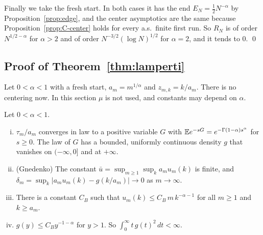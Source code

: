 Finally we take the fresh start. In both cases it has the end $E_N=\frac12N^{-\alpha}$
by Proposition~\ref{prop:edge}, and the center asymptotics are the same because
Proposition~\ref{prop:C-center} holds for every a.s.\ finite first run. So $R_N$ is of
order $N^{1/2-\alpha}$ for $\alpha>2$ and of order $N^{-3/2}(\log N)^{1/2}$ for
$\alpha=2$, and it tends to $0$.
\qed

\subsection{Proof of Theorem~\ref{thm:lamperti}}\label{app:heavy-lamperti}

Let $0<\alpha<1$ with a fresh start, $a_m=m^{1/\alpha}$ and $z_{m,k}=k/a_m$. There is no
centering now. In this section $\mu$ is not used, and constants may depend on $\alpha$.

\begin{lemma}\label{lem:C-stable1}
Let $0<\alpha<1$.
\begin{enumerate}[(i)]
\item $\tau_m/a_m$ converges in law to a positive variable $G$ with
$\mathbb{E} e^{-sG}=e^{-\Gamma(1-\alpha)s^\alpha}$ for $s\ge0$. The law of $G$ has a bounded,
uniformly continuous density $g$ that vanishes on $(-\infty,0]$ and at $+\infty$.
\item (Gnedenko) The constant $\bar u=\sup_{m\ge1}\sup_ka_mu_m(k)$ is finite, and
$\delta_m=\sup_k\lvert a_mu_m(k)-g(k/a_m)\rvert\to0$ as $m\to\infty$.
\item There is a constant $C_B$ such that $u_m(k)\le C_B\,m\,k^{-\alpha-1}$ for all
$m\ge1$ and $k\ge a_m$.
\item $g(y)\le C_By^{-1-\alpha}$ for $y>1$. So $\int_0^\infty t\,g(t)^2\,dt<\infty$.
\end{enumerate}
\end{lemma}

